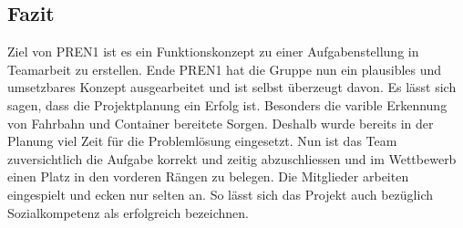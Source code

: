 \subsection{Fazit}

Ziel von PREN1 ist es ein Funktionskonzept zu einer Aufgabenstellung in Teamarbeit zu erstellen. Ende PREN1 hat die Gruppe nun ein plausibles und umsetzbares Konzept ausgearbeitet und ist selbst überzeugt davon. Es lässt sich sagen, dass die Projektplanung ein Erfolg ist. Besonders die varible Erkennung von Fahrbahn und Container bereitete Sorgen. Deshalb wurde bereits in der Planung viel Zeit für die Problemlösung eingesetzt. Nun ist das Team zuversichtlich die Aufgabe korrekt und zeitig abzuschliessen und im Wettbewerb einen Platz in den vorderen Rängen zu belegen. Die Mitglieder arbeiten eingespielt und ecken nur selten an. So lässt sich das Projekt auch bezüglich Sozialkompetenz als erfolgreich bezeichnen.




